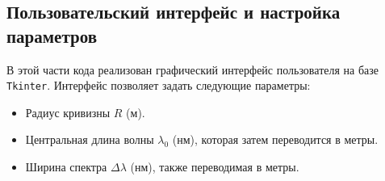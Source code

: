 \documentclass[a4paper,11pt]{article}
\theoremstyle{definition}
\begin{document}
    \subsection{Пользовательский интерфейс и настройка параметров}
    В этой части кода реализован графический интерфейс пользователя на базе \texttt{Tkinter}.
    Интерфейс позволяет задать следующие параметры:
    \begin{itemize}
            \item Радиус кривизны \( R \) (м).
            \item Центральная длина волны \( \lambda_0 \) (нм), которая затем переводится в метры.
            \item Ширина спектра \(\Delta \lambda\) (нм), также переводимая в метры.
    \end{itemize}
\end{document}
